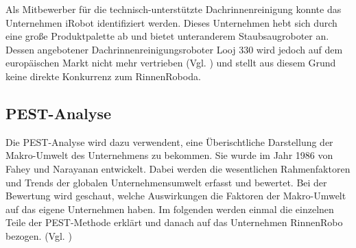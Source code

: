             Als Mitbewerber für die technisch-unterstützte Dachrinnenreinigung konnte das Unternehmen iRobot
            identifiziert werden. Dieses Unternehmen hebt sich durch eine große Produktpalette ab und bietet
            unteranderem Staubsaugroboter an. Dessen angebotener Dachrinnenreinigungsroboter Looj 330 wird jedoch auf
            dem europäischen Markt nicht mehr vertrieben (Vgl. \cite{Erickson2021}) und stellt aus diesem Grund keine direkte
            Konkurrenz zum \as RinnenRobo\adl da.        
        

        \subsection{PEST-Analyse} \label{pest}
            Die PEST-Analyse wird dazu verwendent, eine Überischtliche Darstellung der Makro-Umwelt des Unternehmens zu
            bekommen. Sie wurde im Jahr 1986 von Fahey und Narayanan entwickelt. Dabei werden die wesentlichen 
            Rahmenfaktoren und Trends der globalen Unternehmensumwelt erfasst und bewertet. Bei der Bewertung wird
            geschaut, welche Auswirkungen die Faktoren der Makro-Umwelt auf das eigene Unternehmen haben. Im folgenden 
            werden einmal die einzelnen Teile der PEST-Methode erklärt und danach auf das Unternehmen RinnenRobo
            bezogen. (Vgl. \cite{Schomaker2019})
    
